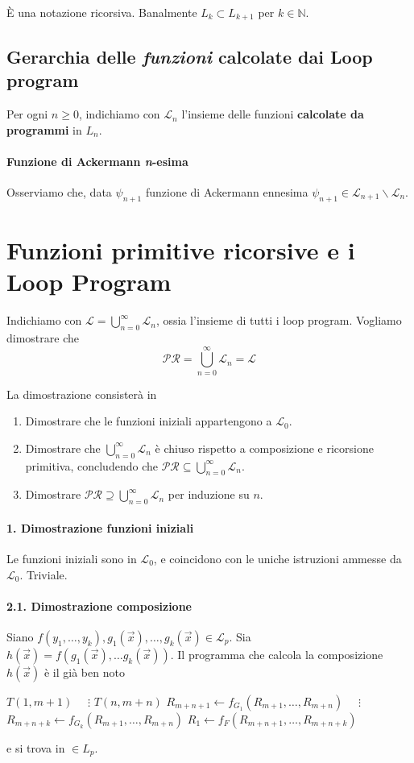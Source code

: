 	È una notazione ricorsiva. Banalmente $L_k \subset L_{k+1}$ per $k \in \mathbb{N}$.
	
	\subsection{Gerarchia delle \textit{funzioni} calcolate dai Loop program}
	Per ogni $n \geq 0$, indichiamo con $\mathcal L_n$ l'insieme delle funzioni \textbf{calcolate da programmi} in $L_n$.   
	
	\paragraph{Funzione di Ackermann \textit{n}-esima}
	Osserviamo che, data $\psi_{n+1}$ funzione di Ackermann ennesima $\psi_{n+1} \in \mathcal{L}_{n+1} \backslash \mathcal{L}_{n}$.
	
	\section{Funzioni primitive ricorsive e i Loop Program}
	Indichiamo con $\mathcal L = \bigcup_{n=0}^\infty \mathcal{L}_n$, ossia l'insieme di tutti i loop program.
	Vogliamo dimostrare che
	$$
	\mathcal{PR} = \bigcup_{n=0}^\infty \mathcal{L}_n = \mathcal{L}
	$$
	
	La dimostrazione consisterà in
	\begin{enumerate}
		\item Dimostrare che le funzioni iniziali appartengono a $\mathcal L_0$.
		
		\item Dimostrare che $\bigcup_{n=0}^\infty \mathcal{L}_n$ è chiuso rispetto a composizione e ricorsione primitiva, concludendo che $\mathcal{PR} \subseteq \bigcup_{n=0}^\infty \mathcal{L}_n$.
		
		\item Dimostrare $\mathcal{PR} \supseteq \bigcup_{n=0}^\infty \mathcal{L}_n$ per induzione su $n$.
	\end{enumerate}
	
	\paragraph{1. Dimostrazione funzioni iniziali}
	Le funzioni iniziali sono in $\mathcal L_0$, e coincidono con le uniche istruzioni ammesse da $\mathcal L_0$. Triviale.
	
	\paragraph{2.1. Dimostrazione composizione} Siano $f(y_1, \dots, y_k), g_1(\vec{x}), \dots, g_k(\vec{x}) \in \mathcal L_p$. Sia $h(\vec{x}) = f(g_1(\vec{x}), \dots g_k(\vec{x}))$. Il programma che calcola la composizione $h(\vec{x})$ è il già ben noto
	\begin{algorithmic}
		\State $T(1, m+1)$
		\State $\quad \vdots$ 
		\State $T(n,m+n)$
		\State $R_{m+n+1} \gets f_{G_1}(R_{m+1}, \dots, R_{m+n})$
		\State $\quad \vdots$
		\State $R_{m+n+k} \gets f_{G_k}(R_{m+1}, \dots, R_{m+n})$
		\State $R_1 \gets f_{F}(R_{m+n+1}, \dots, R_{m+n+k})$
	\end{algorithmic}
	e si trova in $\in L_p$.
	
